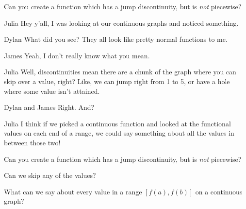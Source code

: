 \documentclass{ximera}
\begin{document}
\begin{question}
Can you create a function which has a jump discontinuity, but is \textit{not} piecewise?
\begin{freeResponse}
\end{freeResponse}
\end{question}

\begin{dialogue}
\item[Julia] Hey y'all, I was looking at our continuous graphs and noticed something.
\item[Dylan] What did you see? They all look like pretty normal functions to me.
\item[James] Yeah, I don't really know what you mean.
\item[Julia] Well, discontinuities mean there are a chunk of the graph where you can skip over a value, right? Like, we can jump right from 1 to 5, or have a hole where some value isn't attained.
\item[Dylan and James] Right. And?
\item[Julia] I think if we picked a continuous function and looked at the functional values on each end of a range, we could say something about all the values in between those two!
\end{dialogue}

\begin{question}
Can you create a function which has a jump discontinuity, but is \textit{not} piecewise?
\begin{freeResponse}
\end{freeResponse}
\end{question}

\begin{question}
\begin{hint}
Can we skip any of the values?
\end{hint}
What can we say about every value in a range $[f(a),f(b)]$ on a continuous graph?
\begin{freeResponse}
\end{freeResponse}
\end{question}
\end{document}
